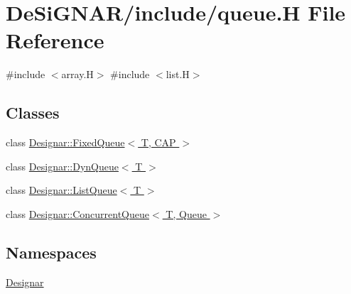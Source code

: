 \hypertarget{queue_8_h}{}\section{De\+Si\+G\+N\+A\+R/include/queue.H File Reference}
\label{queue_8_h}
{\ttfamily \#include $<$array.\+H$>$}\newline
{\ttfamily \#include $<$list.\+H$>$}\newline
\subsection*{Classes}
\begin{DoxyCompactItemize}
\item 
class \hyperlink{class_designar_1_1_fixed_queue}{Designar\+::\+Fixed\+Queue$<$ T, C\+A\+P $>$}
\item 
class \hyperlink{class_designar_1_1_dyn_queue}{Designar\+::\+Dyn\+Queue$<$ T $>$}
\item 
class \hyperlink{class_designar_1_1_list_queue}{Designar\+::\+List\+Queue$<$ T $>$}
\item 
class \hyperlink{class_designar_1_1_concurrent_queue}{Designar\+::\+Concurrent\+Queue$<$ T, Queue $>$}
\end{DoxyCompactItemize}
\subsection*{Namespaces}
\begin{DoxyCompactItemize}
\item 
 \hyperlink{namespace_designar}{Designar}
\end{DoxyCompactItemize}
